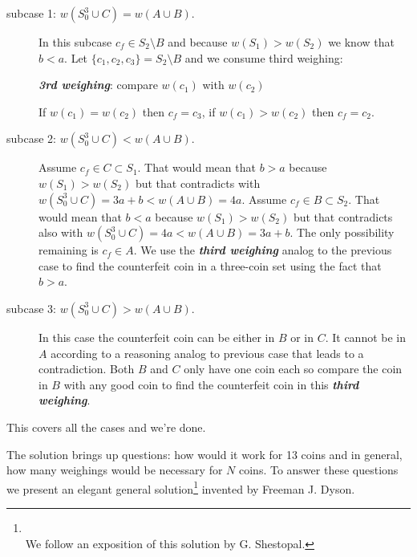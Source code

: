 \begin{description}
	\item [ subcase 1: $w(S_0^3 \cup C) = w(A \cup B)$. ] In this subcase $c_f \in S_2 \setminus B$ and because $w(S_1) > w(S_2)$  we know that $b < a$. Let $\{c_1, c_2, c_3\} = S_2 \setminus B$ and we consume third weighing:
\begin{center} \textbf{\textit{3rd weighing}}: compare $w(c_1)$ with $w(c_2)$ \end{center}
If $w(c_1) = w(c_2)$ then $c_f = c_3$, if $w(c_1) > w(c_2)$ then $c_f = c_2$.	
	\item [ subcase 2: $w(S_0^3 \cup C) < w(A \cup B)$. ] Assume $c_f \in C \subset S_1$. That would mean that $b > a$ because $w(S_1) > w(S_2)$ but that contradicts with \newline
	$w(S_0^3 \cup C) = 3 a + b < w(A \cup B) = 4 a$. Assume $c_f \in B \subset S_2$. That would mean that $b < a$ because $w(S_1) > w(S_2)$ but that contradicts also with
	$w(S_0^3 \cup C) = 4 a < w(A \cup B) = 3 a + b$. The only possibility remaining is $c_f \in A$. We
	use the \textbf{\textit{third weighing}} analog to the previous case to find the counterfeit coin in a three-coin set using the fact that $b > a$.
	\item	[ subcase 3: $w(S_0^3 \cup C) > w(A \cup B)$. ]  In this case the counterfeit coin can be either in $B$ or in $C$. It cannot be in $A$ according to a reasoning analog to previous case that leads to a contradiction. Both $B$ and $C$ only have one coin each so compare the coin in $B$ with any good coin to find the counterfeit coin in this \textbf{\textit{third weighing}}.
\end{description}
	
\noindent This covers all the cases and we're done.

The solution brings up questions: how would it work for 13 coins and in general, how many weighings would be necessary for $N$ coins. To answer these questions we present an elegant general solution\footnote{ \\ We follow an exposition of this solution by G. Shestopal.} invented by Freeman J. Dyson.

